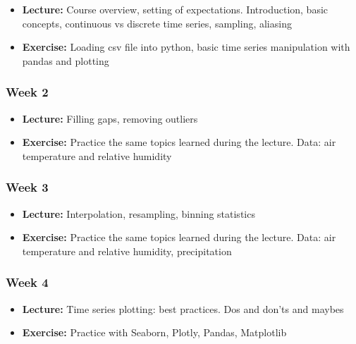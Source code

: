\documentclass[
  letterpaper,
  DIV=11,
  numbers=noendperiod,
  oneside]{scrreprt}
\providecommand{\tightlist}{%
  \setlength{\itemsep}{0pt}\setlength{\parskip}{0pt}}\usepackage{longtable,booktabs,array}
\begin{document}
\begin{itemize}
\tightlist
\item
  \textbf{Lecture:} Course overview, setting of expectations.
  Introduction, basic concepts, continuous vs discrete time series,
  sampling, aliasing
\item
  \textbf{Exercise:} Loading csv file into python, basic time series
  manipulation with pandas and plotting
\end{itemize}

\hypertarget{week-2}{%
\subsubsection*{Week 2}\label{week-2}}

\begin{itemize}
\tightlist
\item
  \textbf{Lecture:} Filling gaps, removing outliers
\item
  \textbf{Exercise:} Practice the same topics learned during the
  lecture. Data: air temperature and relative humidity
\end{itemize}

\hypertarget{week-3}{%
\subsubsection*{Week 3}\label{week-3}}

\begin{itemize}
\tightlist
\item
  \textbf{Lecture:} Interpolation, resampling, binning statistics
\item
  \textbf{Exercise:} Practice the same topics learned during the
  lecture. Data: air temperature and relative humidity, precipitation
\end{itemize}

\hypertarget{week-4}{%
\subsubsection*{Week 4}\label{week-4}}

\begin{itemize}
\tightlist
\item
  \textbf{Lecture:} Time series plotting: best practices. Dos and don'ts
  and maybes
\item
  \textbf{Exercise:} Practice with Seaborn, Plotly, Pandas, Matplotlib
\end{itemize}
\end{document}
